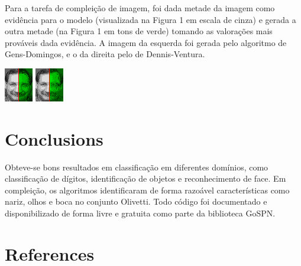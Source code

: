 \documentclass[10pt,a4paper]{article}
\newenvironment{Figure}
  {\par\smallskip\noindent\minipage{\linewidth}}
  {\endminipage\smallskip\par}
\begin{document}
\begin{multicols*}{2}
Para a tarefa de compleição de imagem, foi dada metade da imagem como evidência para o modelo
(visualizada na Figura 1 em escala de cinza) e gerada a outra metade (na Figura 1 em tons de
verde) tomando as valorações mais prováveis dada evidência. A imagem da esquerda foi gerada pelo
algoritmo de Gens-Domingos, e o da direita pelo de Dennis-Ventura.
\begin{Figure}
  \centering\includegraphics[scale=8.0]{imgs/gens_cmpl.png}
  \includegraphics[scale=1.925]{imgs/dennis_cmpl.png}\\
  \vspace{-0.2cm}
\end{Figure}

\section*{Conclusions}

Obteve-se bons resultados em classificação em diferentes domínios, como classificação de dígitos,
identificação de objetos e reconhecimento de face. Em compleição, os algoritmos identificaram
de forma razoável características como nariz, olhos e boca no conjunto Olivetti. Todo código foi
documentado e disponibilizado de forma livre e gratuita como parte da biblioteca GoSPN\@.

\smallskip
\section*{References}
\vspace{0.1cm}

\AtNextBibliography{\fontsize{10pt}{12.0}\selectfont}
\printbibliography[heading=none]

\end{multicols*}
\end{document}
